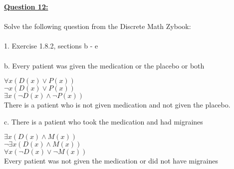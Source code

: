 \documentclass[11pt]{article}
\begin{document}
{\noindent \textbf{\ul{Question 12:}} \\
\\
Solve the following question from the Discrete Math Zybook:\\\\
1. Exercise 1.8.2, sections b - e \\\\
b. Every patient was given the medication or the placebo or both\\
\begin{center}
$\forall x(D(x) \vee P(x))$\\
${\displaystyle \neg} x(D(x) \vee P(x)) $\\
$\exists x ({\displaystyle \neg} D(x) \wedge {\displaystyle \neg} P(x))$\\
There is a patient who is not given medication and not given the placebo.
\end{center}
c. There is a patient who took the medication and had migraines\\
\begin{center}
$\exists x(D(x) \wedge M(x))$\\
${\displaystyle \neg} \exists x(D(x) \wedge M(x))$\\
$\forall x ({\displaystyle \neg} D(x) \vee {\displaystyle \neg} M(x))$\\
Every patient was not given the medication or did not have migraines


\end{center}}
\end{document}
